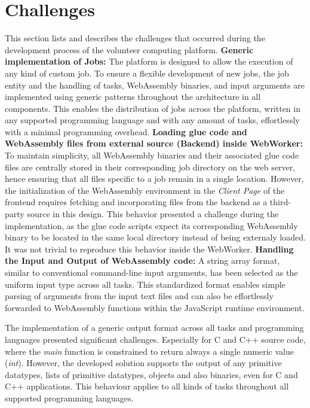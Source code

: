 \section{Challenges}
\label{sec:implementation:challenges}
This section lists and describes the  challenges that occurred during the development process of the volunteer computing platform.
\newline
\newline
\textbf{Generic implementation of Jobs:}
\newline
The platform is designed to allow the execution of any kind of custom job. To ensure a flexible development of new jobs, the job entity and the handling of tasks, WebAssembly binaries, and input arguments are implemented using generic patterns throughout the architecture in all components. This enables the distribution of jobs across the platform, written in any supported programming language and with any amount of tasks, effortlessly with a minimal programming overhead.
\newline
\newline
\textbf{Loading glue code and WebAssembly files from external source (Backend) inside WebWorker:}
\newline
To maintain simplicity, all WebAssembly binaries and their associated glue code files are centrally stored in their corresponding job directory on the web server, hence ensuring that all files specific to a job remain in a single location. However, the initialization of the WebAssembly environment in the \emph{Client Page} of the frontend requires fetching and incorporating files from the backend as a third-party source in this design. This behavior presented a challenge during the implementation, as the glue code scripts expect its corresponding WebAssembly binary to be located in the same local directory instead of being externaly loaded. It was not trivial to reproduce this behavior inside the WebWorker.
\newline
\newline
\textbf{Handling the Input and Output of WebAssembly code:}
\newline
A string array format, similar to conventional command-line input arguments, has been selected as the uniform input type across all tasks. This standardized format enables simple parsing of arguments from the input text files and can also be effortlessly forwarded to WebAssembly functions within the JavaScript runtime environment.

The implementation of a generic output format across all tasks and programming languages presented significant challenges. Especially for C and C++ source code, where the \emph{main} function is constrained to return always a single numeric value (\emph{int}). However, the developed solution supports the output of any primitive datatypes, lists of primitive datatypes, objects and also binaries, even for C and C++ applications. This behaviour applies to all kinds of tasks throughout all supported programming languages.


